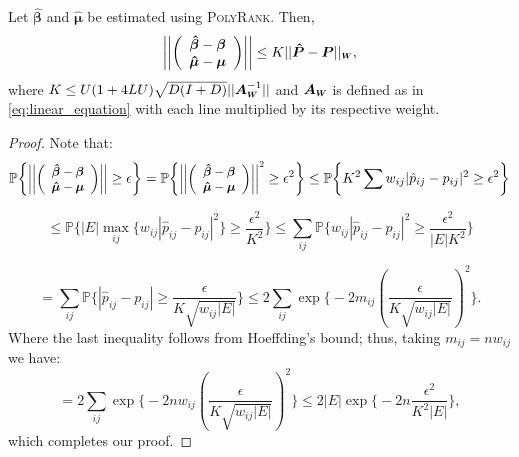 \documentclass[twoside,11pt]{article}
\newcommand*{\Scale}[2][4]{\scalebox{#1}{$#2$}}%
\begin{document}
\begin{lemma}%
\label{the:weighted_sensitivity_realizable}
Let  $\boldsymbol{\hat{\beta}}$ and $\boldsymbol{\hat{\mu}}$ be estimated using \textsc{PolyRank}. Then, 
\begin{equation}
\label{eq:weighted_parameter_sensitivity}\left|\left|\left(\begin{array}{c}
     \boldsymbol{\hat{\beta}} -\boldsymbol{\beta}\\
     \boldsymbol{\hat{\mu}} -\boldsymbol{\mu} 
\end{array}\right) \right|\right| \leq K ||\boldsymbol{\hat P} - \boldsymbol{P}||_{\Scale[.6]{\boldsymbol{W}}},\end{equation}
where  $K \leq U(1+4LU)\sqrt{D(I+D)} || \boldsymbol{A}_{\Scale[.6]{\boldsymbol{W}}}^{-1}|| $ and $\boldsymbol{A}_{\Scale[.6]{\boldsymbol{W}}}$ is defined as in \ref{eq:linear_equation} with each line multiplied by its respective weight.%
\end{lemma}

\begin{proof} Note that:
$$\mathbb{P}\bigg\{\Scale[.9]{\left|\left|\left(\begin{array}{c}
     \boldsymbol{\hat{\beta}} -\boldsymbol{\beta}\\
     \boldsymbol{\hat{\mu}} -\boldsymbol{\mu} 
\end{array}\right) \right|\right|}\geq \epsilon \bigg\} = \mathbb{P}\bigg\{\Scale[.9]{\left|\left|\left(\begin{array}{c}
     \boldsymbol{\hat{\beta}} -\boldsymbol{\beta}\\
     \boldsymbol{\hat{\mu}} -\boldsymbol{\mu} 
\end{array}\right) \right|\right|^2}\geq \epsilon^2 \bigg\} \leq \mathbb{P}\bigg\{ K^2 \sum w_{ij}|\hat{p}_{ij} - p_{ij}|^2\geq \epsilon^2 \bigg\}  $$

$$\leq \mathbb{P}\bigg\{ |E|\max_{ij}\{ w_{ij}|\hat{p}_{ij} - p_{ij}|^2\}\geq \frac{\epsilon^2}{K^2 } \bigg\} \leq \sum_{ij} \mathbb{P}\bigg\{ w_{ij}|\hat{p}_{ij} - p_{ij}|^2\geq \frac{\epsilon^2}{|E|K^2 } \bigg\}  $$

$$ = \sum_{ij} \mathbb{P}\bigg\{ |\hat{p}_{ij} - p_{ij}|\geq \frac{\epsilon}{K \sqrt{w_{ij}|E|}} \bigg\} \leq  2 \sum_{ij} \exp \bigg\{ -2m_{ij}\left(\frac{\epsilon}{K \sqrt{w_{ij}|E|}} \right)^2\bigg\} .$$
Where the last inequality follows from Hoeffding's bound; thus, taking $m_{ij} = nw_{ij}$ we have:
$$ = 2 \sum_{ij} \exp \bigg\{ -2nw_{ij}\left(\frac{\epsilon}{K \sqrt{w_{ij}|E|}} \right)^2\bigg\} \leq 2 |E| \exp \bigg\{ -2n\frac{\epsilon^2}{K^2 |E|} \bigg\} ,$$ 
which completes our proof.
\end{proof}


%

\end{document}
